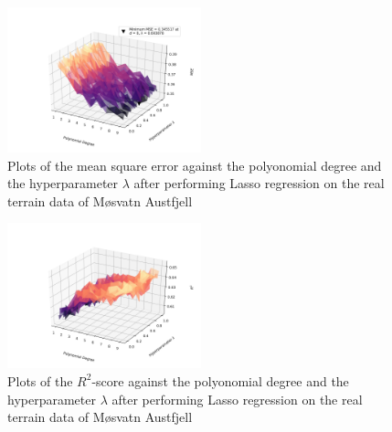 \documentclass[a4paper,10pt,english]{article}
\begin{document}
\begin{figure}[H]
	\centering 
	\includegraphics[width = 0.5\textwidth, center]{../real_output/part_E_2.png}
	\caption{
		Plots of the mean square error against the polyonomial degree and the hyperparameter $\lambda$ after performing Lasso regression on the real terrain data of Møsvatn Austfjell 
	}
	\label{part_g_e2}
\end{figure}

\begin{figure}[H]
	\centering 
	\includegraphics[width = 0.5\textwidth, center]{../real_output/part_E_3.png}
	\caption{
		Plots of the $R^2$-score against the polyonomial degree and the hyperparameter $\lambda$ after performing Lasso regression on the real terrain data of Møsvatn Austfjell
	}
	\label{part_g_e3}
\end{figure}





\end{document}
